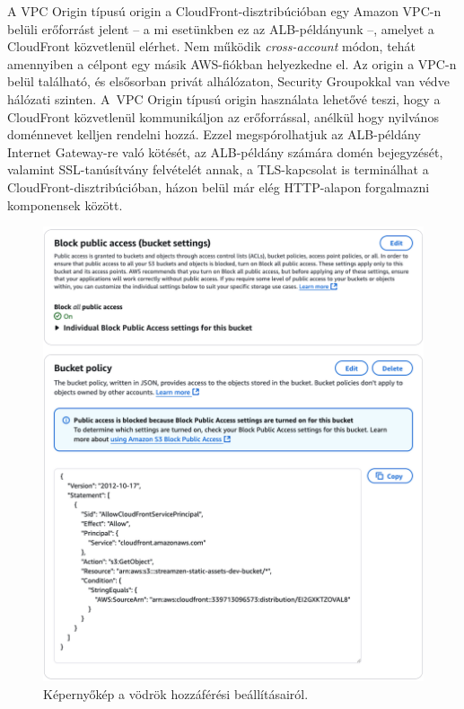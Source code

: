 A VPC Origin típusú origin a CloudFront-disztribúcióban egy Amazon VPC-n belüli erőforrást jelent -- a mi esetünkben ez az ALB-példányunk --, amelyet a CloudFront közvetlenül elérhet. Nem működik \emph{cross-account} módon, tehát amennyiben a célpont egy másik AWS-fiókban helyezkedne el. Az origin a VPC-n belül található, és elsősorban privát alhálózaton, Security Groupokkal van védve hálózati szinten. A~VPC Origin típusú origin használata lehetővé teszi, hogy a CloudFront közvetlenül kommunikáljon az erőforrással, anélkül hogy nyilvános doménnevet kelljen rendelni hozzá. Ezzel megspórolhatjuk az ALB-példány Internet Gateway-re való kötését, az ALB-példány számára domén bejegyzését, valamint SSL-tanúsítvány felvételét annak, a TLS-kapcsolat is terminálhat a CloudFront-disztribúcióban, házon belül már elég HTTP-alapon forgalmazni komponensek között.

\begin{figure}[h]
  \centering
  \includegraphics[width=130mm, keepaspectratio]{figures/distro_s3policy.png}
  \caption{Képernyőkép a vödrök hozzáférési beállításairól.}
  \label{fig:s3policy}
\end{figure}

